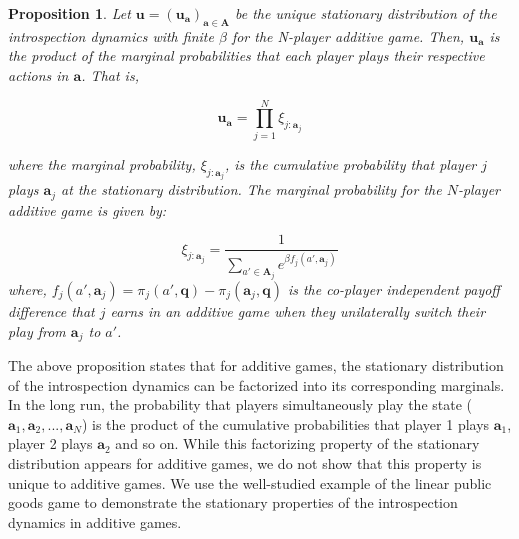 \documentclass[11pt]{article}
\theoremstyle{plainCl1}
\newtheorem{Prop}{Proposition}
\theoremstyle{plainCl2}
\newcommand{\A}{\mathbf{A}}
\newcommand{\abf}{\mathbf{a}}
\newcommand{\qbf}{\mathbf{q}}
\newcommand{\ubf}{\mathbf{u}}
\begin{document}
\begin{Prop}
Let $\ubf = (\ubf_\abf)_{\abf \in \A}$ be the unique stationary distribution of the introspection dynamics with finite $\beta$ for the N-player additive game. Then, $\ubf_\abf$ is the product of the marginal probabilities that each player plays their respective actions in $\abf$. That is, 

\begin{equation}
\ubf_\abf = \prod_{j = 1}^N \xi_{j:\abf_j}
\label{Eq:additive-game-products}
\end{equation}

\noindent where the marginal probability, $\xi_{j:\abf_j}$, is the cumulative probability that player $j$ plays $\abf_j$ at the stationary distribution. The marginal probability for the $N$-player additive game is given by: 

\begin{equation}
\xi_{j:\abf_j} = \frac{1}{\displaystyle \sum_{a' \in \A_j} e^{\beta f_j(a', \abf_j)}} 
\label{Eq:marginal-at-additive-game}
\end{equation}
\noindent where, $f_j(a', \abf_j) = \pi_j(a', \qbf) - \pi_j(\abf_j, \qbf)$ is the co-player independent payoff difference that $j$  earns in an additive game when they unilaterally switch their play from $\abf_j$ to $a'$.
\label{Th:additive-game-product-of-marginals}
\end{Prop}
\noindent The above proposition states that for additive games, the stationary distribution of the introspection dynamics can be factorized into its corresponding marginals. In the long run, the probability that players simultaneously play the state ($\abf_1, \abf_2, ...,\abf_N$) is the product of the cumulative probabilities that player 1 plays $\abf_1$, player 2 plays $\abf_2$ and so on. While this factorizing property of the stationary distribution appears for additive games, we do not show that this property is unique to additive games. We use the well-studied example of the linear public goods game to demonstrate the stationary properties of the introspection dynamics in additive games. 
\end{document}
